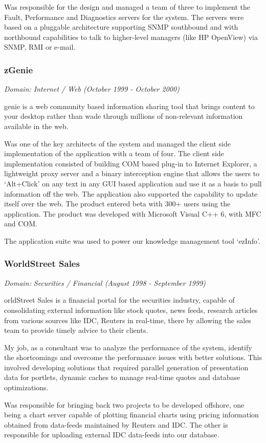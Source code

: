 \documentclass[a4paper,11pt]{article}
\newcommand\cvprojectentry[5]{
  \subsubsection*{#1}
  
  \vspace{-7pt}
  
  \it{Domain: #2}\normalfont{} \quad (#3 - #4)
  
}
\begin{document}
\begin{multicols}{2}
Was responsible for the design and managed a team of three to
implement the Fault, Performance and Diagnostics servers for the
system. The servers were based on a pluggable architecture supporting
SNMP southbound and with northbound capabilities to talk to
higher-level managers (like HP OpenView) via SNMP, RMI or e-mail.
 
\cvprojectentry{zGenie}{Internet / Web}{October 1999}{October 2000}

Zgenie is a web community based information sharing tool that brings
content to your desktop rather than wade through millions of
non-relevant information available in the web.
 
Was one of the key architects of the system and managed the client
side implementation of the application with a team of four. The client
side implementation consisted of building COM based plug-in to
Internet Explorer, a lightweight proxy server and a binary
interception engine that allows the users to `Alt+Click' on any text
in any GUI based application and use it as a basis to pull information
off the web. The application also supported the capability to update
itself over the web. The product entered beta with 300+ users using
the application. The product was developed with Microsoft Visual C++
6, with MFC and COM.
 
The application suite was used to power our knowledge management tool
`ezInfo'.
 
\cvprojectentry{WorldStreet Sales}{Securities / Financial}{August 1998}{September 1999}

 
WorldStreet Sales is a financial portal for the securities industry,
capable of consolidating external information like stock quotes, news
feeds, research articles from various sources like IDC, Reuters in
real-time, there by allowing the sales team to provide timely advice to
their clients.
 
My job, as a consultant was to analyze the performance of the system,
identify the shortcomings and overcome the performance issues with
better solutions. This involved developing solutions that required
parallel generation of presentation data for portlets, dynamic caches
to manage real-time quotes and database optimizations.
 
Was responsible for bringing back two projects to be developed
offshore, one being a chart server capable of plotting financial
charts using pricing information obtained from data-feeds maintained
by Reuters and IDC. The other is responsible for uploading external
IDC data-feeds into our database.
 

\end{multicols}
\end{document}
